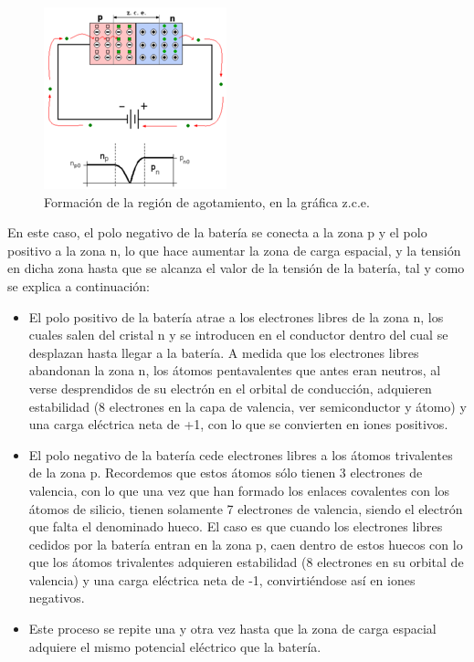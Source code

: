 \begin{figure}[h!]
\centering
\includegraphics[scale=0.7]{PolInv.png}
\caption{Formación de la región de agotamiento, en la gráfica z.c.e.}
\label{fig:diodoInv}
\end{figure}

En este caso, el polo negativo de la batería se conecta a la zona p y el polo positivo a la zona n, lo que hace aumentar la zona de carga espacial, y la tensión en dicha zona hasta que se alcanza el valor de la tensión de la batería, tal y como se explica a continuación:\citep{diodoWiki}\\


\begin{itemize}
    \item El polo positivo de la batería atrae a los electrones libres de la zona n, los cuales salen del cristal n y se introducen en el conductor dentro del cual se desplazan hasta llegar a la batería. A medida que los electrones libres abandonan la zona n, los átomos pentavalentes que antes eran neutros, al verse desprendidos de su electrón en el orbital de conducción, adquieren estabilidad (8 electrones en la capa de valencia, ver semiconductor y átomo) y una carga eléctrica neta de +1, con lo que se convierten en iones positivos.
    \item El polo negativo de la batería cede electrones libres a los átomos trivalentes de la zona p. Recordemos que estos átomos sólo tienen 3 electrones de valencia, con lo que una vez que han formado los enlaces covalentes con los átomos de silicio, tienen solamente 7 electrones de valencia, siendo el electrón que falta el denominado hueco. El caso es que cuando los electrones libres cedidos por la batería entran en la zona p, caen dentro de estos huecos con lo que los átomos trivalentes adquieren estabilidad (8 electrones en su orbital de valencia) y una carga eléctrica neta de -1, convirtiéndose así en iones negativos.
    \item Este proceso se repite una y otra vez hasta que la zona de carga espacial adquiere el mismo potencial eléctrico que la batería.
    
    
\end{itemize}

